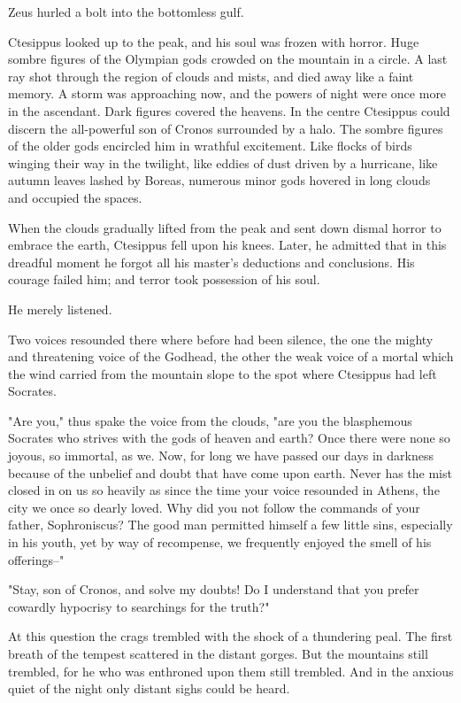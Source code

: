 Zeus hurled a bolt into the bottomless gulf.

Ctesippus looked up to the peak, and his soul was frozen with horror.
Huge sombre figures of the Olympian gods crowded on the mountain in a
circle. A last ray shot through the region of clouds and mists, and
died away like a faint memory. A storm was approaching now, and the
powers of night were once more in the ascendant. Dark figures covered
the heavens. In the centre Ctesippus could discern the all-powerful
son of Cronos surrounded by a halo. The sombre figures of the older
gods encircled him in wrathful excitement. Like flocks of birds
winging their way in the twilight, like eddies of dust driven by a
hurricane, like autumn leaves lashed by Boreas, numerous minor gods
hovered in long clouds and occupied the spaces.

When the clouds gradually lifted from the peak and sent down dismal
horror to embrace the earth, Ctesippus fell upon his knees. Later, he
admitted that in this dreadful moment he forgot all his master's
deductions and conclusions. His courage failed him; and terror took
possession of his soul.

He merely listened.

Two voices resounded there where before had been silence, the one the
mighty and threatening voice of the Godhead, the other the weak voice
of a mortal which the wind carried from the mountain slope to the spot
where Ctesippus had left Socrates.

"Are you," thus spake the voice from the clouds, "are you the
blasphemous Socrates who strives with the gods of heaven and earth?
Once there were none so joyous, so immortal, as we. Now, for long we
have passed our days in darkness because of the unbelief and doubt
that have come upon earth. Never has the mist closed in on us so
heavily as since the time your voice resounded in Athens, the city we
once so dearly loved. Why did you not follow the commands of your
father, Sophroniscus? The good man permitted himself a few little
sins, especially in his youth, yet by way of recompense, we frequently
enjoyed the smell of his offerings--"

"Stay, son of Cronos, and solve my doubts! Do I understand that you
prefer cowardly hypocrisy to searchings for the truth?"

At this question the crags trembled with the shock of a thundering
peal. The first breath of the tempest scattered in the distant gorges.
But the mountains still trembled, for he who was enthroned upon them
still trembled. And in the anxious quiet of the night only distant
sighs could be heard.

